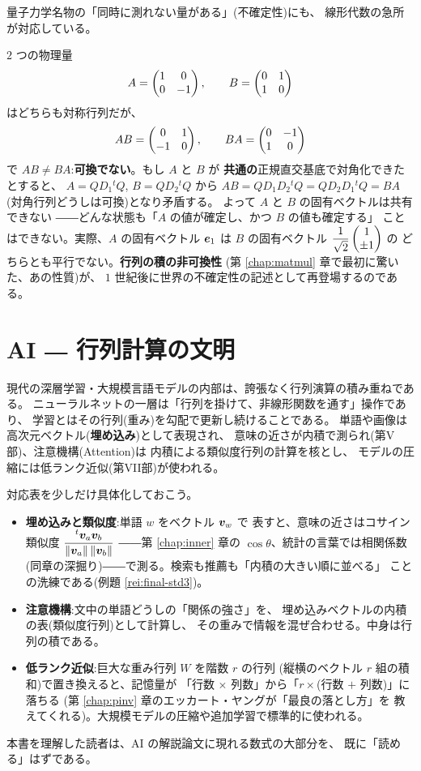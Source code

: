 量子力学名物の「同時に測れない量がある」(不確定性)にも、
線形代数の急所が対応している。

\begin{hanrei}\label{hanrei:final-noncommute}
$2$ つの物理量
\[
A = \begin{pmatrix}1 & 0 \\ 0 & -1\end{pmatrix}, \qquad B = \begin{pmatrix}0 & 1 \\ 1 & 0\end{pmatrix}
\]
はどちらも対称行列だが、
\[
AB = \begin{pmatrix}0 & 1 \\ -1 & 0\end{pmatrix}, \qquad BA = \begin{pmatrix}0 & -1 \\ 1 & 0\end{pmatrix}
\]
で $AB \neq BA$:\textbf{可換でない}。もし $A$ と $B$ が
\textbf{共通の}正規直交基底で対角化できたとすると、
$A = QD_1{}^tQ$, $B = QD_2{}^tQ$ から
$AB = QD_1D_2{}^tQ = QD_2D_1{}^tQ = BA$
(対角行列どうしは可換)となり矛盾する。
よって $A$ と $B$ の固有ベクトルは共有できない
――どんな状態も「$A$ の値が確定し、かつ $B$ の値も確定する」
ことはできない。実際、$A$ の固有ベクトル $\bm{e}_1$ は
$B$ の固有ベクトル $\dfrac{1}{\sqrt{2}}\begin{pmatrix}1 \\ \pm 1\end{pmatrix}$ の
どちらとも平行でない。\textbf{行列の積の非可換性}
(第 \ref{chap:matmul} 章で最初に驚いた、あの性質)が、
$1$ 世紀後に世界の不確定性の記述として再登場するのである。
\end{hanrei}

\section{AI ― 行列計算の文明}

現代の深層学習・大規模言語モデルの内部は、誇張なく行列演算の積み重ねである。
ニューラルネットの一層は「行列を掛けて、非線形関数を通す」操作であり、
学習とはその行列(重み)を勾配で更新し続けることである。
単語や画像は高次元ベクトル(\textbf{埋め込み})として表現され、
意味の近さが内積で測られ(第V部)、注意機構(Attention)は
内積による類似度行列の計算を核とし、
モデルの圧縮には低ランク近似(第VII部)が使われる。

対応表を少しだけ具体化しておこう。
\begin{itemize}
\item \textbf{埋め込みと類似度}:単語 $w$ をベクトル $\bm{v}_w$ で
表すと、意味の近さはコサイン類似度
$\dfrac{{}^t\bm{v}_a\bm{v}_b}{\|\bm{v}_a\|\,\|\bm{v}_b\|}$
――第 \ref{chap:inner} 章の $\cos\theta$、統計の言葉では相関係数
(同章の深掘り)――で測る。検索も推薦も「内積の大きい順に並べる」
ことの洗練である(例題 \ref{rei:final-std3})。
\item \textbf{注意機構}:文中の単語どうしの「関係の強さ」を、
埋め込みベクトルの内積の表(類似度行列)として計算し、
その重みで情報を混ぜ合わせる。中身は行列の積である。
\item \textbf{低ランク近似}:巨大な重み行列 $W$ を階数 $r$ の行列
(縦横のベクトル $r$ 組の積和)で置き換えると、記憶量が
「行数 $\times$ 列数」から「$r \times$(行数 $+$ 列数)」に落ちる
(第 \ref{chap:pinv} 章のエッカート・ヤングが「最良の落とし方」を
教えてくれる)。大規模モデルの圧縮や追加学習で標準的に使われる。
\end{itemize}
本書を理解した読者は、AI の解説論文に現れる数式の大部分を、
既に「読める」はずである。

